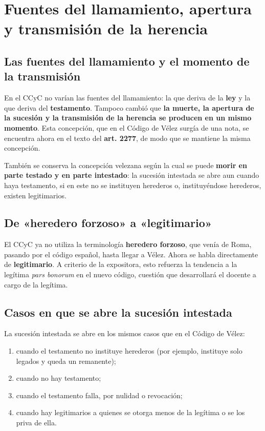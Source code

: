 \documentclass[12pt,oneside]{book}
\begin{document}
\section{Fuentes del llamamiento, apertura y transmisión de la herencia}

\subsection{Las fuentes del llamamiento y el momento de la transmisión}

En el CCyC no varían las fuentes del llamamiento: la que deriva de la \textbf{ley} y la que deriva del \textbf{testamento}. Tampoco cambió que \textbf{la muerte, la apertura de la sucesión y la transmisión de la herencia se producen en un mismo momento}. Esta concepción, que en el Código de Vélez surgía de una nota, se encuentra ahora en el texto del \textbf{art. 2277}, de modo que se mantiene la misma concepción.

También se conserva la concepción velezana según la cual se puede \textbf{morir en parte testado y en parte intestado}: la sucesión intestada se abre aun cuando haya testamento, si en este no se instituyen herederos o, instituyéndose herederos, existen legitimarios.

\subsection{De «heredero forzoso» a «legitimario»}

El CCyC ya no utiliza la terminología \textbf{heredero forzoso}, que venía de Roma, pasando por el código español, hasta llegar a Vélez. Ahora se habla directamente de \textbf{legitimario}. A criterio de la expositora, esto refuerza la tendencia a la legítima \textit{pars bonorum} en el nuevo código, cuestión que desarrollará el docente a cargo de la legítima.

\subsection{Casos en que se abre la sucesión intestada}

La sucesión intestada se abre en los mismos casos que en el Código de Vélez:

\begin{enumerate}
    \item cuando el testamento no instituye herederos (por ejemplo, instituye solo legados y queda un remanente);
    \item cuando no hay testamento;
    \item cuando el testamento falla, por nulidad o revocación;
    \item cuando hay legitimarios a quienes se otorga menos de la legítima o se los priva de ella.
\end{enumerate}
\end{document}

